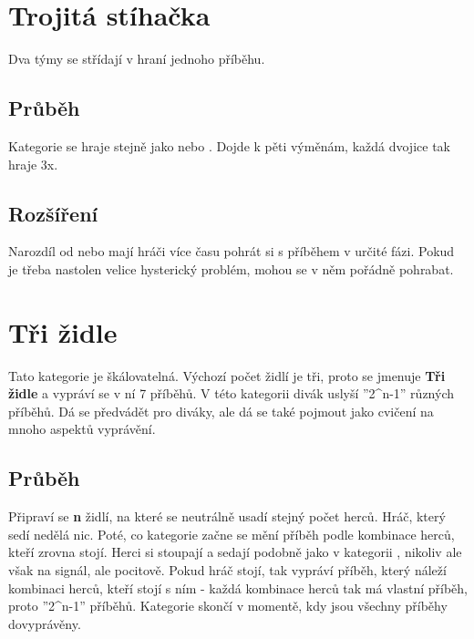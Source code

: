 \documentclass[main.tex]{subfiles}
\begin{document}
 
 
 
\needspace{5cm} \section{Trojitá stíhačka} \label{trojitá stíhačka}  
Dva týmy se střídají v hraní jednoho příběhu. 
 
\subsection{ Průběh } Kategorie se hraje stejně jako  nebo . Dojde k pěti výměnám, každá dvojice tak hraje 3x. 
 
\subsection{ Rozšíření } Narozdíl od  nebo  mají hráči více času pohrát si s příběhem v určité fázi. Pokud je třeba nastolen velice hysterický problém, mohou se v něm pořádně pohrabat. 
 
 
 
 
\needspace{5cm} \section{Tři židle} \label{tři židle}  
 
Tato kategorie je škálovatelná. Výchozí počet židlí je tři, proto se jmenuje \textbf{Tři židle}{} a vypráví se v ní 7 příběhů. V této kategorii divák uslyší ''2\^{}n-1'' různých příběhů.  Dá se předvádět pro diváky, ale dá se také pojmout jako cvičení na mnoho aspektů vyprávění. 
 
\subsection{Průběh}  
Připraví se \textbf{n} židlí, na které se neutrálně usadí stejný počet herců. Hráč, který sedí nedělá nic. Poté, co kategorie začne se mění příběh podle kombinace herců, kteří zrovna stojí. Herci si stoupají a sedají podobně jako v kategorii , nikoliv ale však na signál, ale pocitově. Pokud hráč stojí, tak vypráví příběh, který náleží kombinaci herců, kteří stojí s ním - každá kombinace herců tak má vlastní příběh, proto ''2\^{}n-1'' příběhů. Kategorie skončí v momentě, kdy jsou všechny příběhy dovyprávěny. 
 
\end{document}
